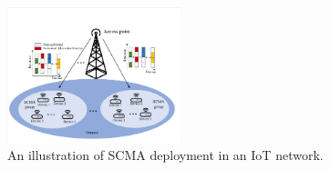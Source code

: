 \documentclass[journal]{IEEEtran}
\begin{document}
 \begin{figure}[t]   %
\centering %
\includegraphics[width=0.45\textwidth]{Fig/Figsystem.pdf} %
\caption{  An illustration of SCMA deployment   in an  IoT network.   } %
\label{FigSys}
 \end{figure}
\end{document}
